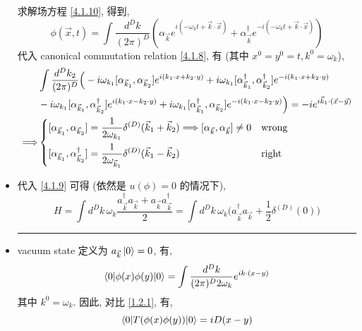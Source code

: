 \begin{itemize}
	\begin{tcolorbox}[title=calculation:]
		求解场方程 \eqref{4.1.10}, 得到,
		\begin{equation}
			\phi(\vec{x}, t) = \int \frac{d^D k}{(2 \pi)^D} (\alpha_{\vec{k}} e^{i (- \omega_k t + \vec{k} \cdot \vec{x})} + \alpha^\dag_{\vec{k}} e^{- i (- \omega_k t + \vec{k} \cdot \vec{x})})
		\end{equation}
		代入 canonical commutation relation \eqref{4.1.8}, 有 (其中 $x^0 = y^0 = t, k^0 = \omega_k$),
		\begin{align}
			& \int \frac{d^D k_2}{(2 \pi)^D} \Big( - i \omega_{k_1} [\alpha_{\vec{k}_1}, \alpha_{\vec{k}_2}] e^{i (k_1 \cdot x + k_2 \cdot y)} + i \omega_{k_1} [\alpha^\dag_{\vec{k}_1}, \alpha^\dag_{\vec{k}_2}] e^{- i (k_1 \cdot x + k_2 \cdot y)} \notag \\
			& - i \omega_{k_1} [\alpha_{\vec{k}_1}, \alpha^\dag_{\vec{k}_2}] e^{i (k_1 \cdot x - k_2 \cdot y)} + i \omega_{k_1} [\alpha^\dag_{\vec{k}_1}, \alpha_{\vec{k}_2}] e^{- i (k_1 \cdot x - k_2 \cdot y)} \Big) = - i e^{i \vec{k}_1 \cdot (\vec{x} - \vec{y})} \notag \\
			\Longrightarrow & \begin{dcases}
				[\alpha_{\vec{k}_1}, \alpha_{\vec{k}_2}] = \frac{1}{2 \omega_{k_1}} \delta^{(D)}(\vec{k}_1 + \vec{k}_2) \Longrightarrow [\alpha_{\vec{k}}, \alpha_{\vec{k}}] \neq 0 & \text{wrong} \\
				[\alpha_{\vec{k}_1}, \alpha^\dag_{\vec{k}_2}] = \frac{1}{2 \omega_{\vec{k}_1}} \delta^{(D)}(\vec{k}_1 - \vec{k}_2) & \text{right}
			\end{dcases}
		\end{align}
	\end{tcolorbox}
	
	\item 代入 \eqref{4.1.9} 可得 (依然是 $u(\phi) = 0$ 的情况下),
	\begin{equation}
		H = \int d^D k \, \omega_k \frac{a^\dag_{\vec{k}} a_{\vec{k}} + a_{\vec{k}} a^\dag_{\vec{k}}}{2} = \int d^D k \, \omega_k \Big( a^\dag_{\vec{k}} a_{\vec{k}} + \frac{1}{2} \delta^{(D)}(0) \Big)
	\end{equation}
	
	\noindent\rule[0.5ex]{\linewidth}{0.5pt} %
	
	\item vacuum state 定义为 $a_{\vec{k}} \ket{0} = 0$, 有,
	\begin{equation}
		\braket{0 | \phi(x) \phi(y) | 0} = \int \frac{d^D k}{(2 \pi)^D 2 \omega_k} e^{i k \cdot (x - y)}
	\end{equation}
	其中 $k^0 = \omega_k$. 因此, 对比 \eqref{1.2.1}, 有,
	\begin{equation}
		\braket{0 | T(\phi(x) \phi(y)) | 0} = i D(x - y)
	\end{equation}
\end{itemize}

